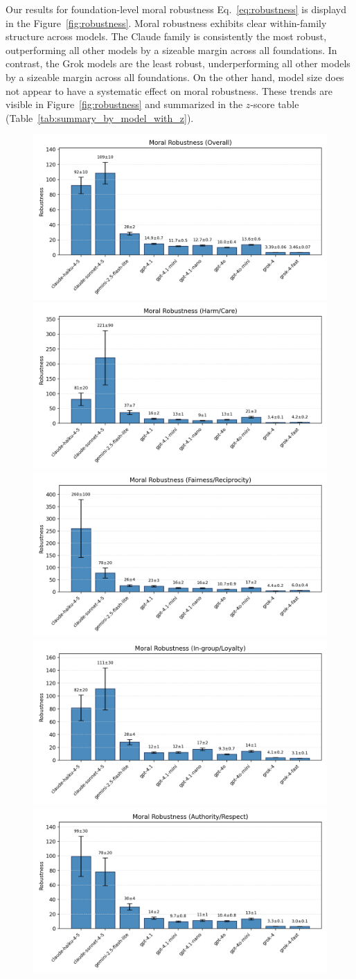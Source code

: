 \documentclass{article}
\begin{document}
Our results for foundation-level moral robustness Eq.~\eqref{eq:robustness} is displayd in the Figure~\ref{fig:robustness}. Moral robustness exhibits clear within-family structure across models. The Claude family is consistently the most robust, outperforming all other models by a sizeable margin across all foundations. In contrast, the Grok models are the least robust, underperforming all other models by a sizeable margin across all foundations. On the other hand, model size does not appear to have a systematic effect on moral robustness. These trends are visible in Figure~\ref{fig:robustness} and summarized in the $z$-score table (Table~\ref{tab:summary_by_model_with_z}).

\begin{figure}[!t]
  \centering
  \includegraphics[width=0.3\linewidth]{../results/robustness_overall.png}\hfill
  \includegraphics[width=0.3\linewidth]{../results/robustness_harm_care.png}\hfill
  \includegraphics[width=0.3\linewidth]{../results/robustness_fairness_reciprocity.png}\\[0.75em]
  \includegraphics[width=0.3\linewidth]{../results/robustness_in_group_loyalty.png}\hfill
  \includegraphics[width=0.3\linewidth]{../results/robustness_authority_respect.png}\hfill

\end{figure}
\end{document}
